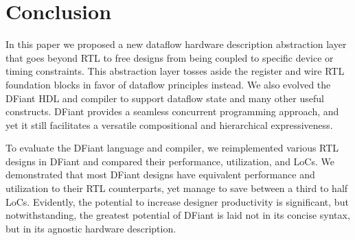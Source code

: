 \section{Conclusion}
\label{sec:conclusion}
In this paper we proposed a new dataflow hardware description abstraction layer that goes beyond RTL to free designs from being coupled to specific device or timing constraints. This abstraction layer tosses aside the register and wire RTL foundation blocks in favor of dataflow principles instead. We also evolved the DFiant HDL and compiler to support dataflow state and many other useful constructs. DFiant provides a seamless concurrent programming approach, and yet it still facilitates a versatile compositional and hierarchical expressiveness. 

To evaluate the DFiant language and compiler, we reimplemented various RTL designs in DFiant and compared their performance, utilization, and LoCs. We demonstrated that most DFiant designs have equivalent performance and utilization to their RTL counterparts, yet manage to save between a third to half LoCs. Evidently, the potential to increase designer productivity is significant, but notwithstanding, the greatest potential of DFiant is laid not in its concise syntax, but in its agnostic hardware description.  




